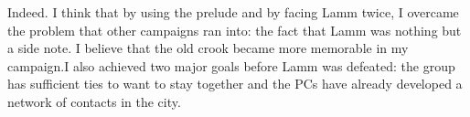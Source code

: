 Indeed. I think that by using the prelude and by facing Lamm twice, I overcame the problem that other campaigns ran into: the fact that Lamm was nothing but a side note. I believe that the old crook became more memorable in my campaign.I also achieved two major goals before Lamm was defeated: the group has sufficient ties to want to stay together and the PCs have already developed a network of contacts in the city. 